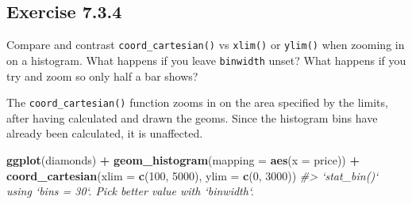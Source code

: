 \documentclass[]{book}
\newenvironment{Shaded}{\begin{snugshade}}{\end{snugshade}}
\newcommand{\CommentTok}[1]{\textcolor[rgb]{0.56,0.35,0.01}{\textit{#1}}}
\newcommand{\DataTypeTok}[1]{\textcolor[rgb]{0.13,0.29,0.53}{#1}}
\newcommand{\DecValTok}[1]{\textcolor[rgb]{0.00,0.00,0.81}{#1}}
\newcommand{\FloatTok}[1]{\textcolor[rgb]{0.00,0.00,0.81}{#1}}
\newcommand{\KeywordTok}[1]{\textcolor[rgb]{0.13,0.29,0.53}{\textbf{#1}}}
\newcommand{\NormalTok}[1]{#1}
\newcommand{\OperatorTok}[1]{\textcolor[rgb]{0.81,0.36,0.00}{\textbf{#1}}}
\newcommand{\StringTok}[1]{\textcolor[rgb]{0.31,0.60,0.02}{#1}}
\theoremstyle{plain}
\theoremstyle{remark}
\theoremstyle{definition}
\theoremstyle{definition}
\theoremstyle{definition}
\theoremstyle{remark}
\begin{document}
\begin{Shaded}
\end{Shaded}

\hypertarget{exercise-7.3.4}{%
\subsection*{\texorpdfstring{Exercise
{7.3.4}}{Exercise 7.3.4}}\label{exercise-7.3.4}}

Compare and contrast \texttt{coord\_cartesian()} vs \texttt{xlim()} or
\texttt{ylim()} when zooming in on a histogram. What happens if you
leave \texttt{binwidth} unset? What happens if you try and zoom so only
half a bar shows?

The \texttt{coord\_cartesian()} function zooms in on the area specified
by the limits, after having calculated and drawn the geoms. Since the
histogram bins have already been calculated, it is unaffected.

\begin{Shaded}
\begin{Highlighting}[]
\KeywordTok{ggplot}\NormalTok{(diamonds) }\OperatorTok{+}
\StringTok{  }\KeywordTok{geom_histogram}\NormalTok{(}\DataTypeTok{mapping =} \KeywordTok{aes}\NormalTok{(}\DataTypeTok{x =}\NormalTok{ price)) }\OperatorTok{+}
\StringTok{  }\KeywordTok{coord_cartesian}\NormalTok{(}\DataTypeTok{xlim =} \KeywordTok{c}\NormalTok{(}\DecValTok{100}\NormalTok{, }\DecValTok{5000}\NormalTok{), }\DataTypeTok{ylim =} \KeywordTok{c}\NormalTok{(}\DecValTok{0}\NormalTok{, }\DecValTok{3000}\NormalTok{))}
\CommentTok{#> `stat_bin()` using `bins = 30`. Pick better value with `binwidth`.}
\end{Highlighting}
\end{Shaded}
\end{document}
